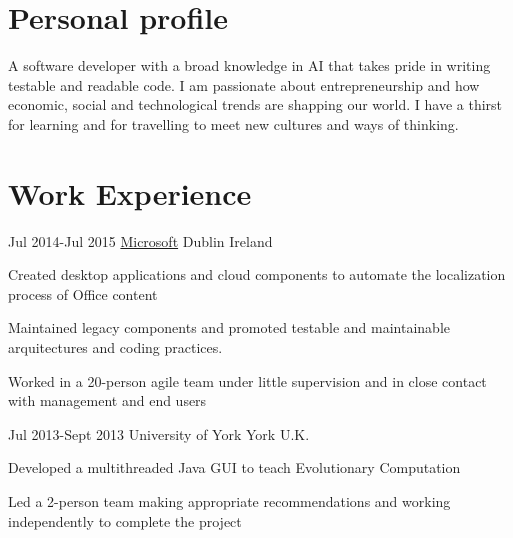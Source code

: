 \documentclass{CurriculumVitae}
\begin{document}
  \makeheading


  \section{Personal profile}
   
    {
      A software developer with a broad knowledge in AI that takes pride in writing testable and readable code.
      I am passionate about entrepreneurship and how economic, social and technological trends are shapping our world. 
      I have a thirst for learning and for travelling to meet new cultures and ways of thinking. 
    }


  \section{Work Experience}
   
      {Jul 2014-Jul 2015}
      {\underline{Microsoft}} 
      {Dublin}
      {Ireland}
      {
         \item Created  desktop applications and cloud components to automate the localization
          process of Office content
         \item Maintained legacy components and promoted testable and maintainable 
         arquitectures and coding practices.
         \item Worked in a 20-person agile team under little supervision and 
         in close contact with management and end users
      }
    
      {Jul 2013-Sept 2013}
      {University of York}
      {York}
      {U.K.}
      {
         \item Developed a multithreaded Java GUI to teach Evolutionary Computation
         \item Led a 2-person team making appropriate recommendations and working independently to 
         complete the project 
      } 
\end{document}
